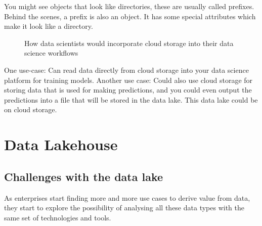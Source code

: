 \documentclass[a4paper, 11pt]{book}
\begin{document}
    You might see objects that look like directories, these are usually called prefixes.
    Behind the scenes, a prefix is also an object.
    It has some special attributes which make it look like a directory.
    \begin{figure}[ht]
        \centering
        \caption{How data scientists would incorporate cloud storage into their data science workflows}
        \label{fig:cloud storage}
    \end{figure}

    One use-case: Can read data directly from cloud storage into your data science platform for training models.
    Another use case: Could also use cloud storage for storing data that is used for making predictions, and you could even output the predictions into a file that will be stored in the data lake.
    This data lake could be on cloud storage.


    \section{Data Lakehouse}


    \subsection{Challenges with the data lake}

    As enterprises start finding more and more use cases to derive value from data, they start to explore the possibility of analysing all these data types with the same set of technologies and tools.
\end{document}

